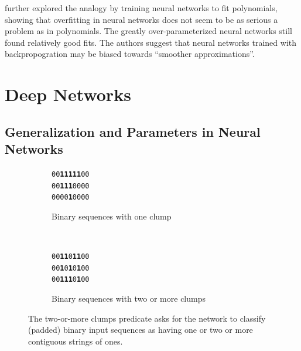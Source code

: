 \documentclass[thesis]{subfiles}
\begin{document}
    \citet{caruana2001overfitting} further explored the analogy by training neural networks to fit polynomials, showing that overfitting in neural networks does not seem to be as serious a problem as in polynomials. The greatly over-parameterized neural networks still found relatively good fits. The authors suggest that neural networks trained with backpropogration may be biased towards ``smoother approximations''.
    
    \section{Deep Networks}
	\citep{Krizhevsky2012}
	\citep{Simonyan2014verydeep}
	\citep{He2015}
	\citep{He2016}
    
	
	
	\subsection{Generalization and Parameters in Neural Networks}
	\begin{figure}[tb]
		\centering
		\large
        \renewcommand{\ttdefault}{pcr}
		\begin{subfigure}[t]{0.45\textwidth}
			\begin{center}
			\texttt{00\textbf{11111}00}\\
			\texttt{00\textbf{111}0000}\\
			\texttt{0000\textbf{1}0000}
			\end{center}
			\caption{Binary sequences with one clump}
			\label{fig:oneclump}
		\end{subfigure}
		~
		\begin{subfigure}[t]{0.45\textwidth}
			\begin{center}
			\texttt{00\textbf{11}0\textbf{11}00}\\
			\texttt{00\textbf{1}0\textbf{1}0\textbf{1}00}\\
			\texttt{00\textbf{111}0\textbf{1}00}
			\end{center}
			\caption{Binary sequences with two or more clumps}
			\label{fig:polyfit20th}
		\end{subfigure}
		
        \renewcommand{\ttdefault}{lmodern}
		\caption[Two-or-more Clump Predicate]{The two-or-more clumps predicate asks for the network to classify (padded) binary input sequences as having one or two or more contiguous strings of ones.}
		\label{fig:tomclumps}
	\end{figure}
	
\end{document}
